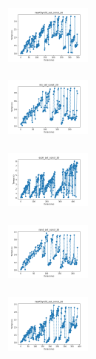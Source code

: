 \begin{figure}[H]
\begin{subfigure}
    \end{subfigure}
    \hfill
    \begin{subfigure}
        \centering
        \includegraphics[width=0.234\textwidth]{img/ils/newthyroid_set_const_20_277451237_time.png}
    \end{subfigure}
    \hfill
    \begin{subfigure}
        \centering
        \includegraphics[width=0.234\textwidth]{img/ils/iris_set_const_20_49258669_time.png}
    \end{subfigure}
    \hfill
    \begin{subfigure}
        \centering
        \includegraphics[width=0.234\textwidth]{img/ils/ecoli_set_const_20_49258669_time.png}
    \end{subfigure}
    \hfill
    \begin{subfigure}
        \centering
        \includegraphics[width=0.234\textwidth]{img/ils/rand_set_const_20_49258669_time.png}
    \end{subfigure}
    \hfill
    \begin{subfigure}
        \centering
        \includegraphics[width=0.234\textwidth]{img/ils/newthyroid_set_const_20_49258669_time.png}
    \end{subfigure}
    \hfill
    \begin{subfigure}

\end{subfigure}
\end{figure}
